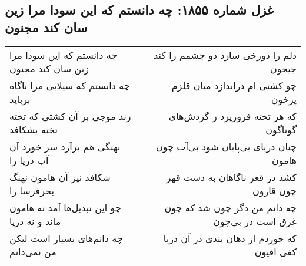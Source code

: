 \begin{center}
\section*{غزل شماره ۱۸۵۵: چه دانستم که این سودا مرا زین سان کند مجنون}
\label{sec:1855}
\begin{longtable}{l p{0.5cm} r}
چه دانستم که این سودا مرا زین سان کند مجنون
&&
دلم را دوزخی سازد دو چشمم را کند جیحون
\\
چه دانستم که سیلابی مرا ناگاه برباید
&&
چو کشتی ام دراندازد میان قلزم پرخون
\\
زند موجی بر آن کشتی که تخته تخته بشکافد
&&
که هر تخته فروریزد ز گردش‌های گوناگون
\\
نهنگی هم برآرد سر خورد آن آب دریا را
&&
چنان دریای بی‌پایان شود بی‌آب چون هامون
\\
شکافد نیز آن هامون نهنگ بحرفرسا را
&&
کشد در قعر ناگاهان به دست قهر چون قارون
\\
چو این تبدیل‌ها آمد نه هامون ماند و نه دریا
&&
چه دانم من دگر چون شد که چون غرق است در بی‌چون
\\
چه دانم‌های بسیار است لیکن من نمی‌دانم
&&
که خوردم از دهان بندی در آن دریا کفی افیون
\\
\end{longtable}
\end{center}
